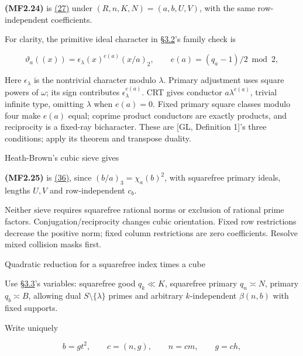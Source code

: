 \hypertarget{mf:eq:B2.24}{}

\label{mf:eq:B2.24}

\textbf{(MF2.24)} is \protect\hyperlink{cf:eq:B.11}{(27)} under \((R,n,K,N)=(a,b,U,V)\), with the same row-independent coefficients.

For clarity, the primitive ideal character in §\protect\hyperlink{cf:sec:B.2}{3.2}'s family check is

\[
\vartheta_a((x))=\epsilon_\lambda(x)^{e(a)}(x/a)_2,\qquad
e(a)=(q_a-1)/2\bmod2,
\]

Here \(\epsilon_\lambda\) is the nontrivial character modulo \(\lambda\). Primary adjustment uses square powers of \(\omega\); its sign contributes \(\epsilon_\lambda^{e(a)}\). CRT gives conductor \(a\lambda^{e(a)}\), trivial infinite type, omitting \(\lambda\) when \(e(a)=0\). Fixed primary square classes modulo four make \(e(a)\) equal; coprime product conductors are exactly products, and reciprocity is a fixed-ray bicharacter. These are {[}GL, Definition 1{]}'s three conditions; apply its theorem and transpose duality.

Heath-Brown's cubic sieve gives

\hypertarget{mf:eq:B2.25}{}

\label{mf:eq:B2.25}

\textbf{(MF2.25)} is \protect\hyperlink{cf:eq:B.19}{(36)}, since \((b/a)_3=\chi_a(b)^2\), with squarefree primary ideals, lengths \(U,V\) and row-independent \(c_b\).

Neither sieve requires squarefree rational norms or exclusion of rational prime factors. Conjugation/reciprocity changes cubic orientation. Fixed row restrictions decrease the positive norm; fixed column restrictions are zero coefficients. Resolve mixed collision masks first.

\hypertarget{quadratic-reduction-for-a-squarefree-index-times-a-cube}{}

\label{quadratic-reduction-for-a-squarefree-index-times-a-cube}

Quadratic reduction for a squarefree index times a cube

Use §\protect\hyperlink{cf:sec:B.3}{3.3}'s variables: squarefree good \(q_k\ll K\), squarefree primary \(q_n\asymp N\), primary \(q_b\asymp B\), allowing dual \(S\setminus\{\lambda\}\) primes and arbitrary \(k\)-independent \(\beta(n,b)\) with fixed supports.

Write uniquely

\[
b=gt^2,\qquad c=(n,g),\qquad n=cm,\qquad g=ch,
\]


